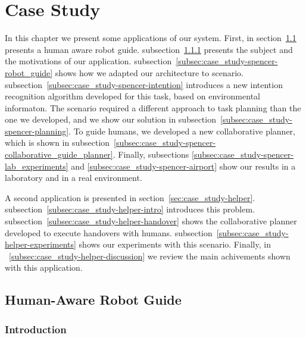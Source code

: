 
\chapter{Case Study} %

\label{chapter:case_study} %


In this chapter we present some applications of our system. First, in section~\ref{sec:case_study-spencer} presents a human aware robot guide. subsection~\ref{subsec:case_study-spencer-intro} presents the subject and the motivations of our application. subsection~\ref{subsec:case_study-spencer-robot_guide} shows how we adapted our architecture to scenario. subsection~\ref{subsec:case_study-spencer-intention} introduces a new intention recognition algorithm developed for this task, based on environmental informaton. The scenario required a different approach to task planning than the one we developed, and we show our solution in subsection~\ref{subsec:case_study-spencer-planning}. To guide humans, we developed a new collaborative planner, which is shown in subsection~\ref{subsec:case_study-spencer-collaborative_guide_planner}. Finally, subsections \ref{subsec:case_study-spencer-lab_experiments} and \ref{subsec:case_study-spencer-airport} show our results in a laboratory and in a real environment.

A second application is presented in section~\ref{sec:case_study-helper}. subsection~\ref{subsec:case_study-helper-intro} introduces this problem. subsection~\ref{subsec:case_study-helper-handover} shows the collaborative planner developed to execute handovers with humans. subsection~\ref{subsec:case_study-helper-experiments} shows our experiments with this scenario. Finally, in ~\ref{subsec:case_study-helper-discussion} we review the main achivements shown with this application. 

\section{Human-Aware Robot Guide}
\label{sec:case_study-spencer}
\subsection{Introduction}
\label{subsec:case_study-spencer-intro}
